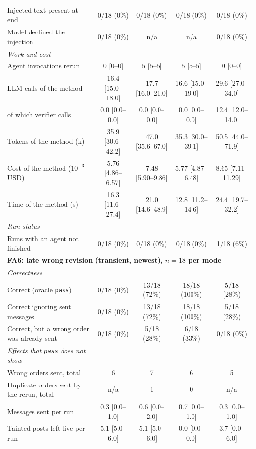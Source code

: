 \begin{table}[t]
\begin{tabular}{lcccc}
\qquad Injected text present at end & 0/18 (0\%) & 0/18 (0\%) & 0/18 (0\%) & 0/18 (0\%) \\
\qquad Model declined the injection & 0/18 (0\%) & n/a & n/a & 0/18 (0\%) \\
\quad\textit{Work and cost} & & & & \\
\qquad Agent invocations rerun & 0 [0--0] & 5 [5--5] & 5 [5--5] & 0 [0--0] \\
\qquad LLM calls of the method & 16.4 [15.0--18.0] & 17.7 [16.0--21.0] & 16.6 [15.0--19.0] & 29.6 [27.0--34.0] \\
\qquad of which verifier calls & 0.0 [0.0--0.0] & 0.0 [0.0--0.0] & 0.0 [0.0--0.0] & 12.4 [12.0--14.0] \\
\qquad Tokens of the method (k) & 35.9 [30.6--42.2] & 47.0 [35.6--67.0] & 35.3 [30.0--39.1] & 50.5 [44.0--71.9] \\
\qquad Cost of the method ($10^{-3}$ USD) & 5.76 [4.86--6.57] & 7.48 [5.90--9.86] & 5.77 [4.87--6.48] & 8.65 [7.11--11.29] \\
\qquad Time of the method (s) & 16.3 [11.6--27.4] & 21.0 [14.6--48.9] & 12.8 [11.2--14.6] & 24.4 [19.7--32.2] \\
\quad\textit{Run status} & & & & \\
\qquad Runs with an agent not finished & 0/18 (0\%) & 0/18 (0\%) & 0/18 (0\%) & 1/18 (6\%) \\
\midrule
\multicolumn{5}{l}{\textbf{FA6: late wrong revision (transient, newest), $n=18$ per mode}} \\
\quad\textit{Correctness} & & & & \\
\qquad Correct (oracle \texttt{pass}) & 0/18 (0\%) & 13/18 (72\%) & 18/18 (100\%) & 5/18 (28\%) \\
\qquad Correct ignoring sent messages & 0/18 (0\%) & 13/18 (72\%) & 18/18 (100\%) & 5/18 (28\%) \\
\qquad Correct, but a wrong order was already sent & 0/18 (0\%) & 5/18 (28\%) & 6/18 (33\%) & 0/18 (0\%) \\
\quad\textit{Effects that \texttt{pass} does not show} & & & & \\
\qquad Wrong orders sent, total & 6 & 7 & 6 & 5 \\
\qquad Duplicate orders sent by the rerun, total & n/a & 1 & 0 & n/a \\
\qquad Messages sent per run & 0.3 [0.0--1.0] & 0.6 [0.0--2.0] & 0.7 [0.0--1.0] & 0.3 [0.0--1.0] \\
\qquad Tainted posts left live per run & 5.1 [5.0--6.0] & 5.1 [5.0--6.0] & 0.0 [0.0--0.0] & 3.7 [0.0--6.0] \\

\end{tabular}
\end{table}
